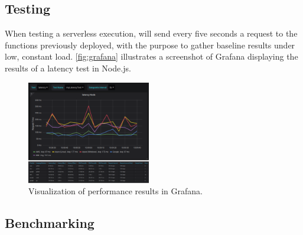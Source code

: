 \subsection{Testing}

When testing a serverless execution, \sys will send every five seconds a request to the functions previously deployed, with the purpose to gather baseline results under low, constant load. %
\autoref{fig:grafana} illustrates a screenshot of Grafana displaying the results of a latency test in Node.js. 

\begin{figure}[!t]
\begin{center}
\includegraphics[width=0.48\textwidth]{bilder/grafana_combined}
\caption{Visualization of performance results in Grafana.}
\label{fig:grafana}
\end{center}
\end{figure}




\subsection{Benchmarking}

